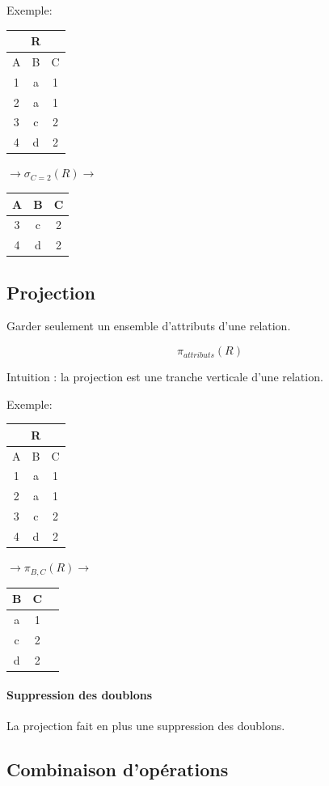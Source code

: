 \documentclass[a4paper]{article}
\begin{document}
  Exemple:
  \begin{tabular}{|c|c|c|}
	\multicolumn{3}{c}{R}\\
	\hline
	A & B & C\\
	\hline\hline
	1 & a & 1\\
	2 & a & 1\\
	3 & c & 2\\
	4 & d & 2\\
	\hline
  \end{tabular}
  $\rightarrow \sigma_{C=2}(R) \rightarrow$
  \begin{tabular}{|c|c|c|}
	\hline
	A & B & C\\
	\hline\hline
	3 & c & 2\\
	4 & d & 2\\
	\hline
  \end{tabular}

  \subsection{Projection}
  Garder seulement un ensemble d'attributs d'une relation.

  $$ \pi_{attributs}(R) $$

  Intuition : la projection est une tranche verticale d'une relation.

    Exemple:
  \begin{tabular}{|c|c|c|}
	\multicolumn{3}{c}{R}\\
	\hline
	A & B & C\\
	\hline\hline
	1 & a & 1\\
	2 & a & 1\\
	3 & c & 2\\
	4 & d & 2\\
	\hline
  \end{tabular}
  $\rightarrow \pi_{B,C}(R) \rightarrow$
  \begin{tabular}{|c|c|c|}
	\hline
	B & C\\
	\hline\hline
	a & 1\\
	c & 2\\
	d & 2\\
	\hline
  \end{tabular}
  
  \paragraph{Suppression des doublons}
  La projection fait en plus une suppression des doublons.

  \subsection{Combinaison d'opérations}
\end{document}
